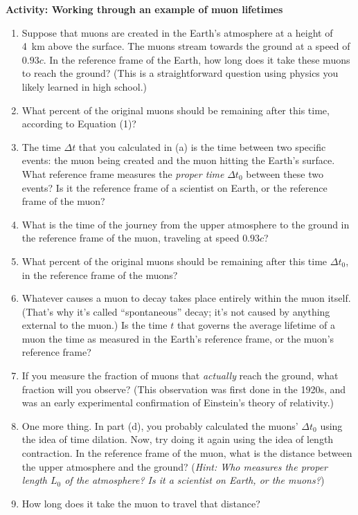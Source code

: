 \bigskip

\textbf{Activity: Working through an example of muon lifetimes} 

\begin{enumerate}[labparts]
\item   
Suppose that muons are created in the Earth's atmosphere at a height of 4~km above the surface.  The muons stream towards the ground at a speed of $0.93c$.
In the reference frame of the Earth, how long does it take these muons to reach the ground?
(This is a straightforward question using physics you likely learned in high school.)
\answerspace{0.9in}

\item What percent of the original muons should be remaining after this time, according to Equation (1)? 
\answerspace{0.7in}

\item The time $\Delta t$ that you calculated in (a) is the time between two specific events: the muon being created and the muon hitting the Earth's surface.  What reference frame measures the \textit{proper time} $\Delta t_0$ between these two events?  Is it the reference frame of a scientist on Earth, or the reference frame of the muon?
\answerspace{0.7in}

\item What is the time of the journey from the upper atmosphere to the ground in the reference frame of the muon, traveling at speed $0.93c$?
\answerspace{0.8in}

\item What percent of the original muons should be remaining after this time $\Delta t_0$, in the reference frame of the muons?
\answerspace{0.6in}

\item Whatever causes a muon to decay takes place entirely within the muon itself.  (That's why it's called ``spontaneous'' decay; it's not caused by anything external to the muon.)  
Is the time $t$ that governs the average lifetime of a muon the time as measured in the Earth's reference frame, or the muon's reference frame?  
\answerspace{0.6in}

\item If you measure the fraction of muons that \textit{actually} reach the ground, what fraction will you observe?
(This observation was first done in the 1920s, and was an early experimental confirmation of Einstein's theory of relativity.)
\answerspace{0.6in}

\item One more thing.  In part (d), you probably calculated the muons' $\Delta t_0$ using the idea of time dilation.  Now, try doing it again using the idea of length contraction.  In the reference frame of the muon, what is the distance between the upper atmosphere and the ground?  (\textit{Hint: Who measures the proper length $L_0$ of the atmosphere?  Is it a scientist on Earth, or the muons?})
\answerspace{0.8in}

\item How long does it take the muon to travel that distance?
\answerspace{0.6in}

\end{enumerate}

